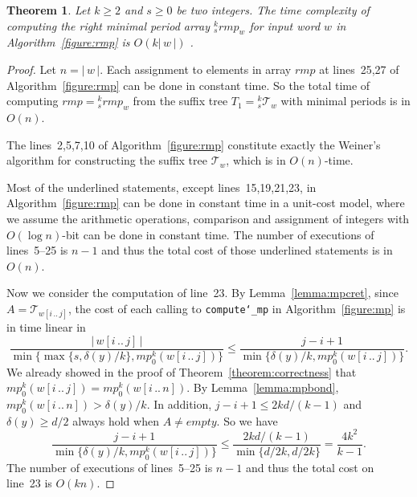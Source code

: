 \documentclass{article}
\def\us{\char`\_}
\def\subw#1#2#3{{#1[#2\,..\,#3]}}
\def\abs#1{{|\,#1\,|}}
\def\tree{\mathcal{T}}
\newtheorem{theorem}{Theorem}
\begin{document}
\begin{theorem}\label{theorem:complexity}
Let $k\geq2$ and $s\geq0$ be two integers. The time complexity of
computing the right minimal period array ${}_s^krmp_w$ for input
word $w$ in Algorithm~\ref{figure:rmp} is $O(k\abs{w})$ .
\end{theorem}
\begin{proof}
Let $n=\abs{w}$. Each assignment to elements in array $rmp$ at
lines~25,27 of Algorithm~\ref{figure:rmp} can be done in constant
time. So the total time of computing $rmp={}_s^krmp_w$ from the
suffix tree $T_1={}_s^k\tree_w$ with minimal periods is in $O(n)$.

The lines~2,5,7,10 of Algorithm~\ref{figure:rmp} constitute exactly
the Weiner's algorithm for constructing the suffix tree $\tree_w$,
which is in $O(n)$-time.

Most of the underlined statements, except lines~15,19,21,23, in
Algorithm~\ref{figure:rmp} can be done in constant time in a
unit-cost model, where we assume the arithmetic operations,
comparison and assignment of integers with $O(\log n)$-bit can be
done in constant time. The number of executions of lines~5--25 is
$n-1$ and thus the total cost of those underlined statements is in
$O(n)$.

Now we consider the computation of line~23. By
Lemma~\ref{lemma:mpcret}, since $A=\tree_{\subw{w}{i}{j}}$, the cost
of each calling to {\tt compute\us mp} in Algorithm~\ref{figure:mp}
is in time linear in
  \[\frac{\abs{\subw{w}{i}{j}}}{\min\{\max\{s,\delta(y)/k\},mp_0^k(\subw{w}{i}{j})\}}
  \leq\frac{j-i+1}{\min\{\delta(y)/k,mp_0^k(\subw{w}{i}{j})\}}.\]
We already showed in the proof of Theorem~\ref{theorem:correctness}
that $mp_0^k(\subw{w}{i}{j})=mp_0^k(\subw{w}{i}{n})$. By
Lemma~\ref{lemma:mpbond}, $mp_0^k(\subw{w}{i}{n})>\delta(y)/k$. In
addition, $j-i+1\leq2kd/(k-1)$ and $\delta(y)\geq d/2$ always hold
when $A\neq empty$. So we have
  \[\frac{j-i+1}{\min\{\delta(y)/k,mp_0^k(\subw{w}{i}{j})\}}
  \leq\frac{2kd/(k-1)}{\min\{d/2k,d/2k\}}=\frac{4k^2}{k-1}.\]
The number of executions of lines~5--25 is $n-1$ and thus the total
cost on line~23 is $O(kn)$.


\end{proof}
\end{document}
